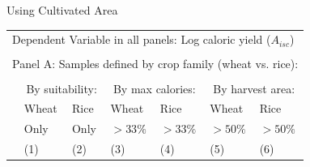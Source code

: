 \documentclass[10pt, xcolor=dvipsnames]{beamer}
\begin{document}

\begin{frame}{Using Cultivated Area}

{\footnotesize
\begin{tabularx}{\textwidth}{lXXXXXX}
\midrule
\multicolumn{7}{l}{Dependent Variable in all panels: Log caloric yield ($A_{isc}$)} \\ \\
\multicolumn{7}{l}{Panel A: Samples defined by crop family (wheat vs. rice):} \\ \\
 & \multicolumn{2}{c}{By suitability:} & \multicolumn{2}{c}{By max calories:} & \multicolumn{2}{c}{By harvest area:}\\ \cmidrule(lr){2-3} \cmidrule(lr){4-5} \cmidrule(lr){6-7} 
 & Wheat & Rice & Wheat  & Rice  & Wheat  & Rice \\
 & Only & Only &  $>33\%$ & $>33\%$ & $>50\%$ & $>50\%$   \\
 & (1) & (2) & (3) & (4) & (5) & (6) \\
\midrule

\midrule
\end{tabularx}
}

\end{frame}
\end{document}
